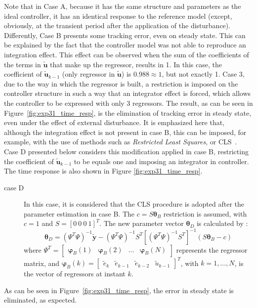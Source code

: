 \begin{exmp}
   Note that in Case A, because it has the same structure and parameters as the ideal controller, it has an identical response to the reference model (except, obviously, at the transient period after the application of the disturbance).
   Differently, Case B presents some tracking error, even on steady state. This can be explained by the fact that the controller model was not able to reproduce an integration effect. This effect can be observed when the sum of the coefficients of the terms in $\tilde{\bm{u}}$ that make up the regressor, results in 1. In this case, the coefficient of $\tilde{\bm{u}}_{k-1}$ (only regressor in $\tilde{\bm{u}}$) is $0.988 \approx 1$, but not exactly 1.
   Case 3, due to the way in which the regressor is built, a restriction is imposed on the controller structure in such a way that an integrator effect is forced, which allows the controller to be expressed with only 3 regressors. The result, as can be seen in Figure~\ref{fig:exp31_time_resp}, is the elimination of tracking error in steady state, even under the effect of external disturbance.
%
   It is emphasized here that, although the integration effect is not present in case B, this can be imposed, for example, with the use of methods such as \textit{Restricted Least Squares}, or CLS~\citep{draper1998}. Case D presented below considers this modification applied in case B, restricting the coefficient of $\tilde{\bm{u}}_{k-1}$ to be equals one and imposing an integrator in controller. The time response is also shown in Figure \ref{fig:exp31_time_resp}.

   \begin{description}
   \item[case D] In this case, it is considered that the CLS procedure is adopted after the parameter estimation in case B. The $c=S \bm{\theta}_B$ restriction is assumed, with $c=1$ and $S = [0\ 0\ 0 \ 1]^T$. The new parameter vector $\bm{\theta}_D$ is calculated by \citep{draper1998}:
         \begin{equation}
            \bm{\theta}_D = (\Psi^T\Psi)^{-1}\tilde{\bm{y}} - (\Psi^T\Psi)^{-1}S^T\left[(\Psi^T\Psi)^{-1}S^T\right]^{-1}\left(S\bm{\theta}_{B} - c\right)
         \end{equation}
   where $\Psi^T = \begin{bmatrix} \bm{\varphi}_{B}(1) & \bm{\varphi}_{B}(2) & \dots & \bm{\varphi}_{B}(N) \end{bmatrix} $ represents the regressor matrix, and $\bm{\varphi}_B(k) = \begin{bmatrix} \tilde{e}_k & \tilde{e}_{k-1} & \tilde{e}_{k-2} & \tilde{u}_{k-1} \end{bmatrix}^T$, with $k=1,\dots,N$, is the vector of regressors at instant $k$.
   \end{description}

   As can be seen in Figure~\ref{fig:exp31_time_resp}, the error in steady state is eliminated, as expected.

\end{exmp}

